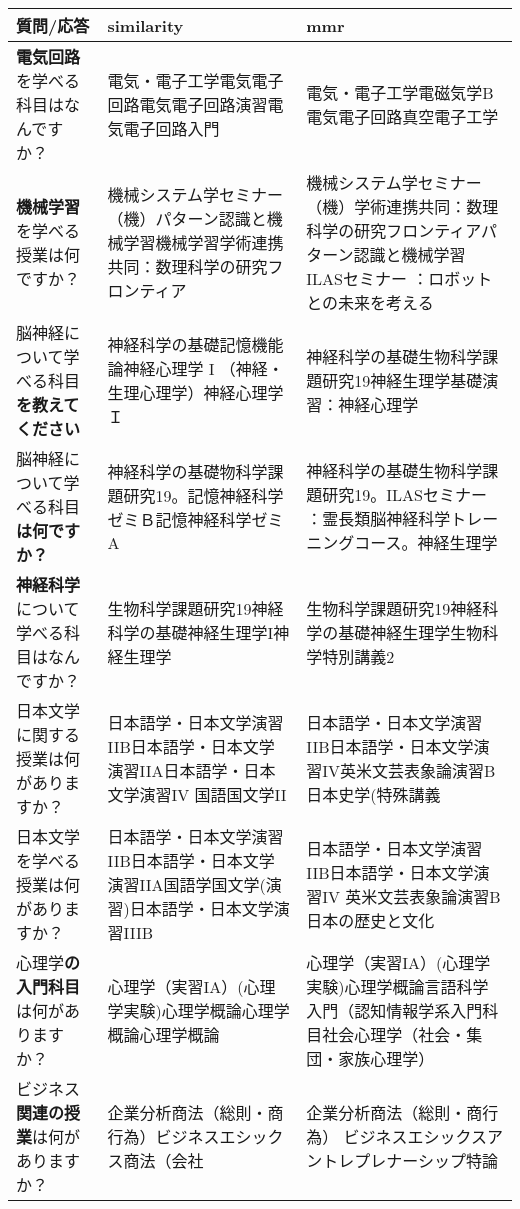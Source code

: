 \begin{table}[h!]
    \centering
    \begin{tabular}{|p{4cm}|p{6cm}|p{6cm}|}
        \hline
        質問/応答 & similarity & mmr \\ \hline
        \textbf{電気回路}を学べる科目はなんですか？ & 電気・電子工学電気電子回路電気電子回路演習電気電子回路入門 & 電気・電子工学電磁気学B電気電子回路真空電子工学 \\ \hline
        \textbf{機械学習}を学べる授業は何ですか？ & 機械システム学セミナー（機）パターン認識と機械学習機械学習学術連携共同：数理科学の研究フロンティア & 機械システム学セミナー（機）学術連携共同：数理科学の研究フロンティアパターン認識と機械学習 ILASセミナー ：ロボットとの未来を考える \\ \hline
        脳神経について学べる科目\textbf{を教えてください} & 神経科学の基礎記憶機能論神経心理学 I （神経・生理心理学）神経心理学Ｉ & 神経科学の基礎生物科学課題研究19神経生理学基礎演習：神経心理学 \\ \hline
        脳神経について学べる科目\textbf{は何ですか？} & 神経科学の基礎物科学課題研究19。記憶神経科学ゼミＢ記憶神経科学ゼミA & 神経科学の基礎生物科学課題研究19。ILASセミナー ：霊長類脳神経科学トレーニングコース。神経生理学 \\ \hline
        \textbf{神経科学}について学べる科目はなんですか？ & 生物科学課題研究19神経科学の基礎神経生理学I神経生理学 & 生物科学課題研究19神経科学の基礎神経生理学生物科学特別講義2 \\ \hline
        日本文学に関する授業は何がありますか？ & 日本語学・日本文学演習IIB日本語学・日本文学演習IIA日本語学・日本文学演習IV 国語国文学II & 日本語学・日本文学演習IIB日本語学・日本文学演習IV英米文芸表象論演習B日本史学(特殊講義 \\ \hline
        日本文学を学べる授業は何がありますか？ & 日本語学・日本文学演習IIB日本語学・日本文学演習IIA国語学国文学(演習)日本語学・日本文学演習IIIB & 日本語学・日本文学演習IIB日本語学・日本文学演習IV 英米文芸表象論演習B日本の歴史と文化 \\ \hline
        心理学\textbf{の入門科目}は何がありますか？ & 心理学（実習IA）(心理学実験)心理学概論心理学概論心理学概論 & 心理学（実習IA）(心理学実験)心理学概論言語科学入門（認知情報学系入門科目社会心理学（社会・集団・家族心理学） \\ \hline
        ビジネス\textbf{関連の授業}は何がありますか？ & 企業分析商法（総則・商行為）ビジネスエシックス商法（会社 & 企業分析商法（総則・商行為） ビジネスエシックスアントレプレナーシップ特論 \\ \hline

\end{tabular}
\end{table}
